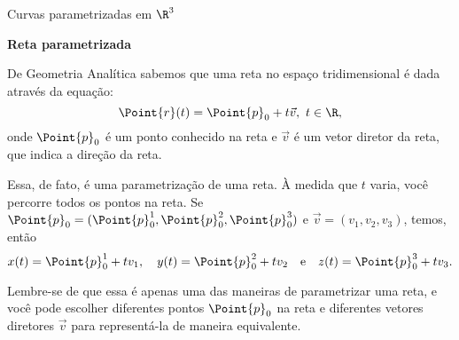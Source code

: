 \begin{examples}{Curvas parametrizadas em $\R^3$}{}

\textbf{Reta parametrizada} 

De Geometria Analítica sabemos que uma reta no espaço tridimensional é dada através da equação:
\[ \Point{r}(t) = \Point{p}_0 + t\vec{v},~t\in\R,\]
onde
\(\Point{p}_0\) é um ponto conhecido na reta e 
 \(\vec{v}\) é um vetor diretor da reta, que indica a direção da reta. 
 
Essa, de fato, é uma parametrização de uma reta. À medida que \(t\) varia, você percorre todos os pontos na reta. Se $\Point{p}_0=(\Point{p}_0^1,\Point{p}_0^2,\Point{p}_0^3)$ e $\vec{v}=(v_1,v_2,v_3)$, temos, então
$$x(t)=\Point{p}_0^1+t v_1,\quad y(t)=\Point{p}_0^2+tv_2\quad \mbox{e}\quad z(t)=\Point{p}_0^3+tv_3. $$

Lembre-se de que essa é apenas uma das maneiras de parametrizar uma reta, e você pode escolher diferentes pontos \(\Point{p}_0\) na reta e diferentes vetores diretores \(\vec{v}\) para representá-la de maneira equivalente.

\begin{center}
\end{center}
\end{examples}
